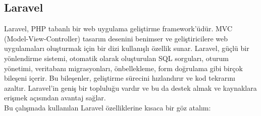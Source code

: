 \subsection{Laravel}
Laravel, PHP tabanlı bir web uygulama geliştirme framework'üdür. MVC (Model-View-Controller) tasarım desenini benimser ve geliştiricilere web uygulamaları oluşturmak için bir dizi kullanışlı özellik sunar. Laravel, güçlü bir yönlendirme sistemi, otomatik olarak oluşturulan SQL sorguları, oturum yönetimi, veritabanı migrasyonları, önbellekleme, form doğrulama gibi birçok bileşeni içerir. Bu bileşenler, geliştirme sürecini hızlandırır ve kod tekrarını azaltır. Laravel'in geniş bir topluluğu vardır ve bu da destek almak ve kaynaklara erişmek açısından avantaj sağlar.\cite{laravel_documentation}\\
Bu çalışmada kullanılan Laravel özelliklerine kısaca bir göz atalım:
